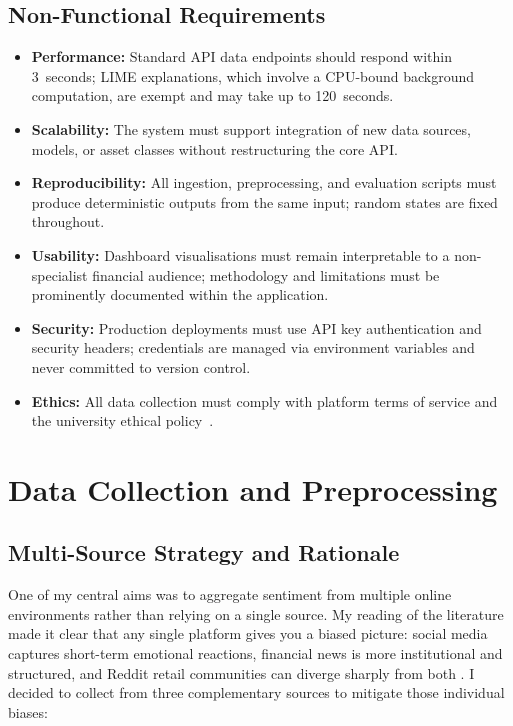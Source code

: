 \subsection{Non-Functional Requirements}

\begin{itemize}
    \item \textbf{Performance:}  Standard API data endpoints should respond within 3~seconds; LIME explanations, which involve a CPU-bound background computation, are exempt and may take up to 120~seconds.
    \item \textbf{Scalability:}  The system must support integration of new data sources, models, or asset classes without restructuring the core API.
    \item \textbf{Reproducibility:}  All ingestion, preprocessing, and evaluation scripts must produce deterministic outputs from the same input; random states are fixed throughout.
    \item \textbf{Usability:}  Dashboard visualisations must remain interpretable to a non-specialist financial audience; methodology and limitations must be prominently documented within the application.
    \item \textbf{Security:}  Production deployments must use API key authentication and security headers; credentials are managed via environment variables and never committed to version control.
    \item \textbf{Ethics:}  All data collection must comply with platform terms of service and the university ethical policy~\citep{lboro_ethics}.
\end{itemize}

\section{Data Collection and Preprocessing}
\label{sec:data_collection}

\subsection{Multi-Source Strategy and Rationale}

One of my central aims was to aggregate sentiment from multiple online environments rather than relying on a single source. My reading of the literature made it clear that any single platform gives you a biased picture: social media captures short-term emotional reactions, financial news is more institutional and structured, and Reddit retail communities can diverge sharply from both \citep{tetlock2007giving, bollen2011twitter, long2023reddit, schumaker2009textmining}. I decided to collect from three complementary sources to mitigate those individual biases:

